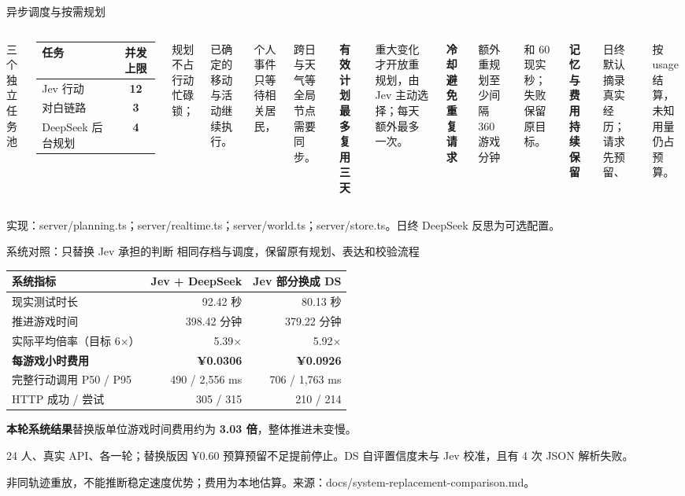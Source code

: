 \documentclass[aspectratio=169,10pt,fontset=fandol]{ctexbeamer}
\newcommand{\source}[1]{\vfill{\fontsize{6.3}{8}\selectfont\color{Muted}#1\par}}
\newcommand{\lead}[1]{{\large\color{Forest}#1}\par\medskip}
\newcommand{\key}[1]{\textbf{\color{Forest}#1}}
\newcommand{\jev}[1]{\textbf{\color{Jev}#1}}
\newcommand{\ds}[1]{\textbf{\color{DS}#1}}
\newcommand{\point}[2]{\key{#1}\par{\small #2}\par\medskip}
\begin{document}
\begin{frame}{异步调度与按需规划}
\begin{columns}[T,onlytextwidth]
\lead{三个独立任务池}
\begin{tabularx}{\linewidth}{@{}Yc@{}}\toprule
\key{任务} & \key{并发上限}\\\midrule
Jev 行动 & \jev{12}\\
对白链路 & \jev{3}\\
DeepSeek 后台规划 & \ds{4}\\\bottomrule
\end{tabularx}\par\medskip
{\small 规划不占行动忙碌锁；\par 已确定的移动与活动继续执行。\par 个人事件只等待相关居民，\par 跨日与天气等全局节点需要同步。}
\point{有效计划最多复用三天}{重大变化才开放重规划，由 Jev 主动选择；每天额外最多一次。}
\point{冷却避免重复请求}{额外重规划至少间隔 360 游戏分钟\par 和 60 现实秒；失败保留原目标。}
\point{记忆与费用持续保留}{日终默认摘录真实经历；请求先预留、\par 按 usage 结算，未知用量仍占预算。}
\end{columns}
\source{实现：server/planning.ts；server/realtime.ts；server/world.ts；server/store.ts。日终 DeepSeek 反思为可选配置。}
\end{frame}

\begin{frame}{系统对照：只替换 Jev 承担的判断}
\lead{相同存档与调度，保留原有规划、表达和校验流程}
{\small\begin{tabularx}{\linewidth}{@{}Yrr@{}}\toprule
\key{系统指标} & \jev{Jev + DeepSeek} & \ds{Jev 部分换成 DS}\\\midrule
现实测试时长 & 92.42 秒 & 80.13 秒\\
推进游戏时间 & 398.42 分钟 & 379.22 分钟\\
实际平均倍率（目标 6×） & 5.39× & 5.92×\\
\key{每游戏小时费用} & \jev{¥0.0306} & \ds{¥0.0926}\\
完整行动调用 P50 / P95 & 490 / 2,556 ms & 706 / 1,763 ms\\
HTTP 成功 / 尝试 & 305 / 315 & 210 / 214\\\bottomrule
\end{tabularx}}\par\medskip
\key{本轮系统结果}\quad 替换版单位游戏时间费用约为 \jev{3.03 倍}，整体推进未变慢。
\source{24 人、真实 API、各一轮；替换版因 ¥0.60 预算预留不足提前停止。DS 自评置信度未与 Jev 校准，且有 4 次 JSON 解析失败。\par 非同轨迹重放，不能推断稳定速度优势；费用为本地估算。来源：docs/system-replacement-comparison.md。}
\end{frame}
\end{document}
